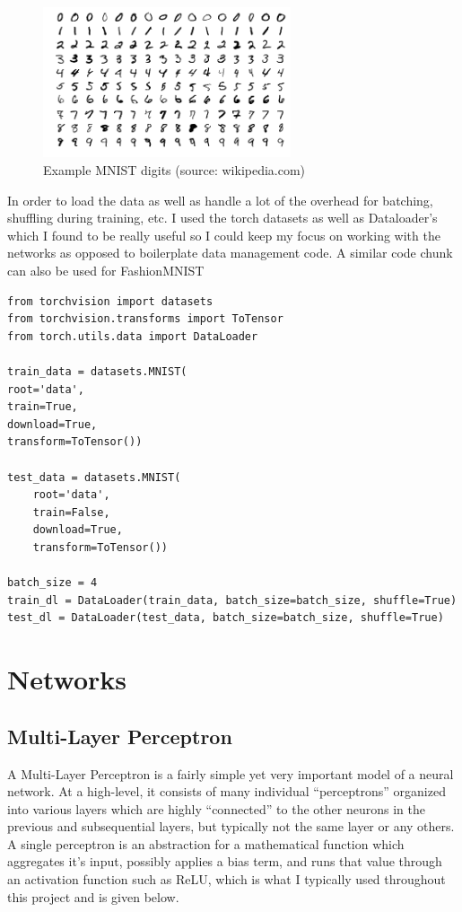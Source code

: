 \documentclass[12pt, twoside]{report}
\begin{document}
\begin{figure}[H]
    \centering
    \includegraphics[width=0.65\textwidth]{figures/MnistExamples.png}
    \caption*{Example MNIST digits (source: wikipedia.com)}
\end{figure}

In order to load the data as well as handle a lot of the overhead for
batching, shuffling during training, etc. I used the torch datasets as well
as Dataloader's which I found to be really useful so I could keep my focus on 
working with the networks as opposed to boilerplate data management code.
A similar code chunk can also be used for FashionMNIST

\begin{lstlisting}[style=Python,caption=Loading MNIST,label=lst:python]
from torchvision import datasets
from torchvision.transforms import ToTensor
from torch.utils.data import DataLoader

train_data = datasets.MNIST(
root='data',
train=True,
download=True,
transform=ToTensor())

test_data = datasets.MNIST(
    root='data',
    train=False,
    download=True,
    transform=ToTensor())

batch_size = 4
train_dl = DataLoader(train_data, batch_size=batch_size, shuffle=True)
test_dl = DataLoader(test_data, batch_size=batch_size, shuffle=True)
\end{lstlisting}

\section{Networks}

\subsection{Multi-Layer Perceptron}

A Multi-Layer Perceptron is a fairly simple yet very important model of a neural network.
At a high-level, it consists of many individual ``perceptrons'' organized into various layers
which are highly ``connected'' to the other neurons in the previous and subsequential layers, but
typically not the same layer or any others. A single perceptron is an abstraction for a mathematical 
function which aggregates it's input, possibly applies a bias term, and runs that value through an
activation function such as ReLU, which is what I typically used throughout this project and is given below.
\end{document}
